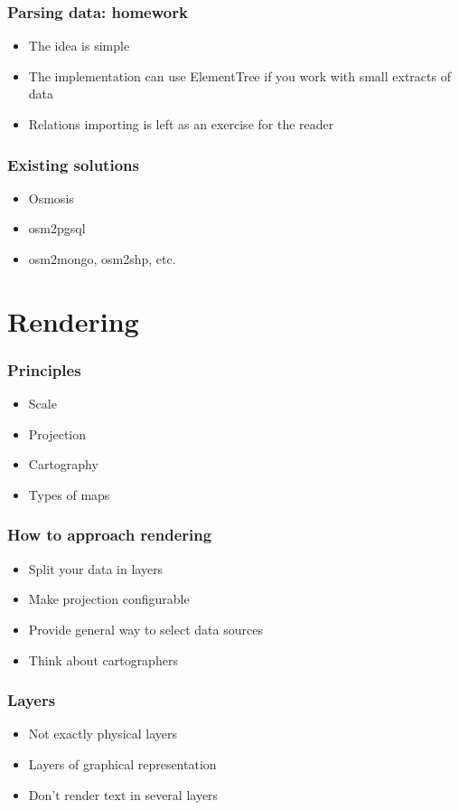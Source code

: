 \documentclass[14pt]{beamer}
\begin{document}
\begin{frame}
  \frametitle{Parsing data: homework}
  \begin{itemize}
  \item The idea is simple
  \item The implementation can use ElementTree if you work with
    small extracts of data
  \item Relations importing is left as an exercise for the reader
  \end{itemize}
\end{frame}

\begin{frame}
  \frametitle{Existing solutions}
  \begin{itemize}
  \item Osmosis
  \item osm2pgsql
  \item osm2mongo, osm2shp, etc.
  \end{itemize}
\end{frame}

\section{Rendering}

\begin{frame}
  \frametitle{Principles}
  \begin{itemize}
  \item Scale
  \item Projection
  \item Cartography
  \item Types of maps
  \end{itemize}
\end{frame}

\begin{frame}
  \frametitle{How to approach rendering}
  \begin{itemize}
  \item Split your data in layers
  \item Make projection configurable
  \item Provide general way to select data sources
  \item Think about cartographers
  \end{itemize}
\end{frame}

\begin{frame}
  \frametitle{Layers}
  \begin{itemize}
  \item Not exactly physical layers
  \item Layers of graphical representation
  \item Don't render text in several layers
  \end{itemize}
\end{frame}
\end{document}
